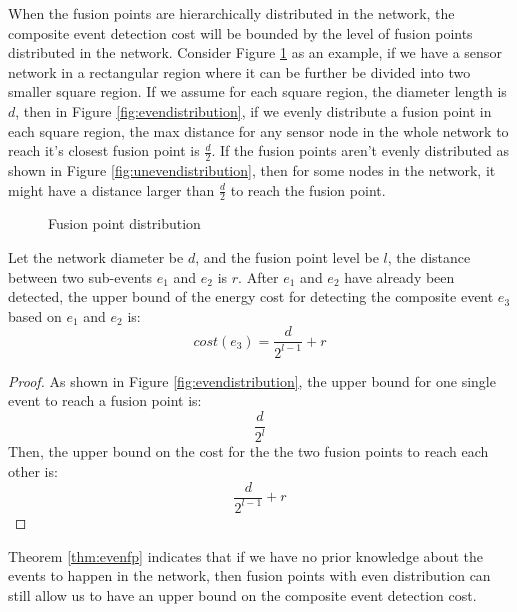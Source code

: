 When the fusion points are hierarchically distributed in the network, the composite event detection cost will be bounded by the level of fusion points distributed in the network. Consider Figure \ref{fig:fpdistribution} as an example, if we have a sensor network in a rectangular region where it can be further be divided into two smaller square region. If we assume for each square region, the diameter length is \(d\), then in Figure \ref{fig:evendistribution}, if we evenly distribute a fusion point in each square region, the max distance for any sensor node in the whole network to reach it's closest fusion point is \(\frac{d}{2}\). If the fusion points aren't evenly distributed as shown in Figure \ref{fig:unevendistribution}, then for some nodes in the network, it might have a distance larger than \(\frac{d}{2}\) to reach the fusion point.

\begin{figure}
\centering
{}
\caption{Fusion point distribution}
\label{fig:fpdistribution}
\end{figure}

\begin{theorem}
\label{thm:evenfp}
Let the network diameter be \(d\), and the fusion point level be \(l\), the distance between two sub-events \(e_1\) and \(e_2\) is \(r\). After \(e_1\) and \(e_2\) have already been detected, the upper bound of the energy cost for detecting the composite event \(e_3\) based on \(e_1\) and \(e_2\) is:
\[
cost(e_3)=\frac{d}{2^{l-1}}+r
\]
\end{theorem}

\begin{proof}
As shown in Figure \ref{fig:evendistribution}, the upper bound for one single event to reach a fusion point is:
\begin{displaymath}
\frac{d}{2^{l}}
\end{displaymath}
Then, the upper bound on the cost for the the two fusion points to reach each other is:
\begin{displaymath}
\frac{d}{2^{l-1}}+r
\end{displaymath}
\end{proof}

Theorem \ref{thm:evenfp} indicates that if we have no prior knowledge about the events to happen in the network, then fusion points with even distribution can still allow us to have an upper bound on the composite event detection cost.

